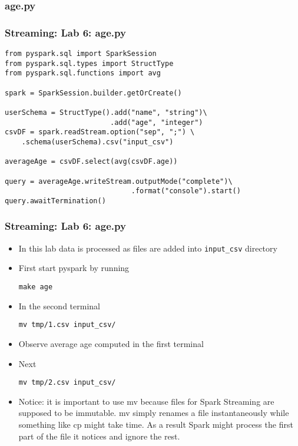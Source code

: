 \documentclass{beamer}
\begin{document}
\subsubsection{age.py}
\begin{frame}[fragile]
\frametitle{Streaming: Lab 6: age.py}
{\small
{\color{mycolorcode}
\begin{verbatim}
from pyspark.sql import SparkSession
from pyspark.sql.types import StructType
from pyspark.sql.functions import avg

spark = SparkSession.builder.getOrCreate()

userSchema = StructType().add("name", "string")\
                         .add("age", "integer")
csvDF = spark.readStream.option("sep", ";") \
    .schema(userSchema).csv("input_csv")

averageAge = csvDF.select(avg(csvDF.age))

query = averageAge.writeStream.outputMode("complete")\
                              .format("console").start()
query.awaitTermination()
\end{verbatim}
}
}
\end{frame}

\begin{frame}[fragile]
\frametitle{Streaming: Lab 6: age.py}
\begin{itemize}
\item In this lab data is processed as files are added into {\color{mycolorcli}\verb|input_csv|} directory
\item First start pyspark by running
{\color{mycolorcli}
\begin{verbatim}
make age
\end{verbatim}
}
\item In the second terminal 
{\color{mycolorcli}
\begin{verbatim}
mv tmp/1.csv input_csv/
\end{verbatim}
}
\item Observe average age computed in the first terminal
\item Next
{\color{mycolorcli}
\begin{verbatim}
mv tmp/2.csv input_csv/
\end{verbatim}
}
\item Notice: it is important to use {\color{mycolorcli}mv} because files for Spark Streaming are supposed to be immutable. {\color{mycolorcli}mv} simply renames a file instantaneously while 
something like {\color{mycolorcli}cp} might take time. As a result Spark might process the first part of the file it notices and ignore the rest.
\end{itemize}
\end{frame}
\end{document}
